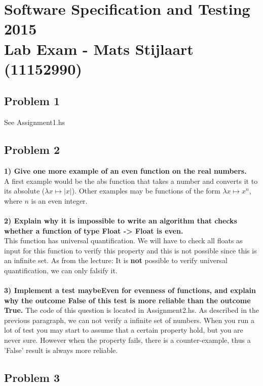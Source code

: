 \section*{Software Specification and Testing 2015 \\ Lab Exam - Mats Stijlaart (11152990)}

\subsection*{Problem 1}

See Assignment1.hs

\subsection*{Problem 2}

\textbf{1) Give one more example of an even function on the real numbers.}\\

\noindent
A first example would be the abs function that takes a number and converts it to its absolute ($\lambda x \mapsto |x|$).
Other examples may be functions of the form $\lambda x \mapsto x^n$, where $n$ is an even integer. \\
\\
\noindent
\textbf{2) Explain why it is impossible to write an algorithm that checks whether a function of type Float -> Float is even.}\\
This function has universal quantification. We will have to check all floats as input for this function to verify this property and this is not possible since this is an infinite set.
As from the lecture: It is \textbf{not} possible to verify universal quantification, we can only falsify it. \\
\\
\noindent
\textbf{3) Implement a test maybeEven for evenness of functions, and explain why the outcome False of this test is more reliable than the outcome True.}
The code of this question is located in Assignment2.hs. As described in the previous paragraph, we can not verify a infinite set of numbers.
When you run a lot of test you may start to assume that a certain property hold, but you are never sure.
However when the property fails, there is a counter-example, thus a 'False' result is always more reliable.

\subsection*{Problem 3}

